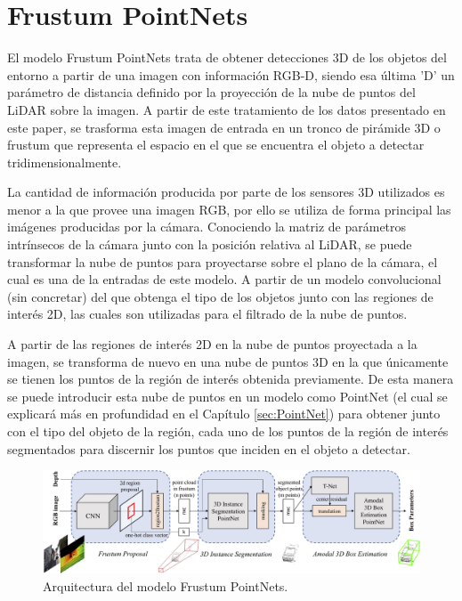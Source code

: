 \section{Frustum PointNets}
\label{sec:Frustum PointNets}

El modelo Frustum PointNets \cite{Frustum_PointNets} trata de obtener detecciones 3D de los objetos del entorno a partir de una imagen con información RGB-D, siendo esa última 'D' un parámetro de distancia definido por la proyección de la nube de puntos del \ac{LiDAR} sobre la imagen. A partir de este tratamiento de los datos presentado en este paper, se trasforma esta imagen de entrada en un tronco de pirámide 3D o frustum que representa el espacio en el que se encuentra el objeto a detectar tridimensionalmente.

La cantidad de información producida por parte de los sensores 3D utilizados es menor a la que provee una imagen RGB, por ello se utiliza de forma principal las imágenes producidas por la cámara. Conociendo la matriz de parámetros intrínsecos de la cámara junto con la posición relativa al \ac{LiDAR}, se puede transformar la nube de puntos para proyectarse sobre el plano de la cámara, el cual es una de la entradas de este modelo. A partir de un modelo convolucional (sin concretar) del que obtenga el tipo de los objetos junto con las regiones de interés 2D, las cuales son utilizadas para el filtrado de la nube de puntos.

A partir de las regiones de interés 2D en la nube de puntos proyectada a la imagen, se transforma de nuevo en una nube de puntos 3D en la que únicamente se tienen los puntos de la región de interés obtenida previamente. De esta manera se puede introducir esta nube de puntos en un modelo como PointNet \cite{PointNet} (el cual se explicará más en profundidad en el Capítulo \ref{sec:PointNet}) para obtener junto con el tipo del objeto de la región, cada uno de los puntos de la región de interés segmentados para discernir los puntos que inciden en el objeto a detectar.

\begin{figure}[H]
    \centering
    \includegraphics[width=1\textwidth]{Book/figures/2_estado_arte/frustum_pointnets.png}
    \caption{Arquitectura del modelo Frustum PointNets.}
    \label{fig:Arquitectura del modelo Frustum PointNets.}
\end{figure}

